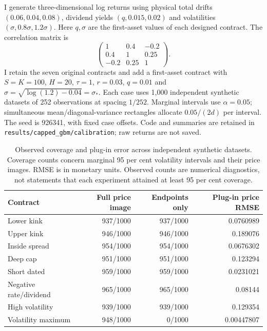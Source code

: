 \documentclass[11pt]{article}
\begin{document}
I generate three-dimensional log returns using physical total drifts
$(0.06,0.04,0.08)$, dividend yields $(q,0.015,0.02)$ and volatilities
$(\sigma,0.8\sigma,1.2\sigma)$. Here $q,\sigma$ are the first-asset
values of each designed contract. The correlation matrix is
\begin{equation}
 \begin{pmatrix}1&0.4&-0.2\\0.4&1&0.25\\-0.2&0.25&1\end{pmatrix}.
 \label{eq:cgbm-synthetic-correlation}
\end{equation}
I retain the seven original contracts and add a first-asset contract with
$S=K=100$, $H=20$, $\tau=1$, $r=0.03$, $q=0.01$ and
$\sigma=\sqrt{\log(1.2)-0.04}=\sigma_*$.
Each case uses 1,000 independent synthetic datasets of 252 observations
at spacing $1/252$. Marginal intervals use $\alpha=0.05$; simultaneous
mean/diagonal-variance rectangles allocate $0.05/(2d)$ per interval.
The seed is 926341, with fixed case offsets. Code and summaries are
retained in \texttt{results/capped\_gbm/calibration}; raw returns are not saved.

\begin{table}[tb]\centering\small
\begin{tabular}{lrrr}\toprule
Contract & Full price image & Endpoints only & Plug-in price RMSE\\\midrule
Lower kink & 937/1000 & 937/1000 & 0.0760989 \\
Upper kink & 946/1000 & 946/1000 & 0.189076 \\
Inside spread & 954/1000 & 954/1000 & 0.0676302 \\
Deep cap & 951/1000 & 951/1000 & 0.123294 \\
Short dated & 959/1000 & 959/1000 & 0.0231021 \\
Negative rate/dividend & 965/1000 & 965/1000 & 0.08144 \\
High volatility & 939/1000 & 939/1000 & 0.129354 \\
Volatility maximum & 948/1000 & 0/1000 & 0.00447807 \\
\bottomrule\end{tabular}
\caption{Observed coverage and plug-in error across independent synthetic datasets. Coverage counts concern marginal 95 per cent volatility intervals and their price images. RMSE is in monetary units. Observed counts are numerical diagnostics, not statements that each experiment attained at least 95 per cent coverage.}
\label{tab:cgbm-calibration-coverage}\end{table}
\end{document}
